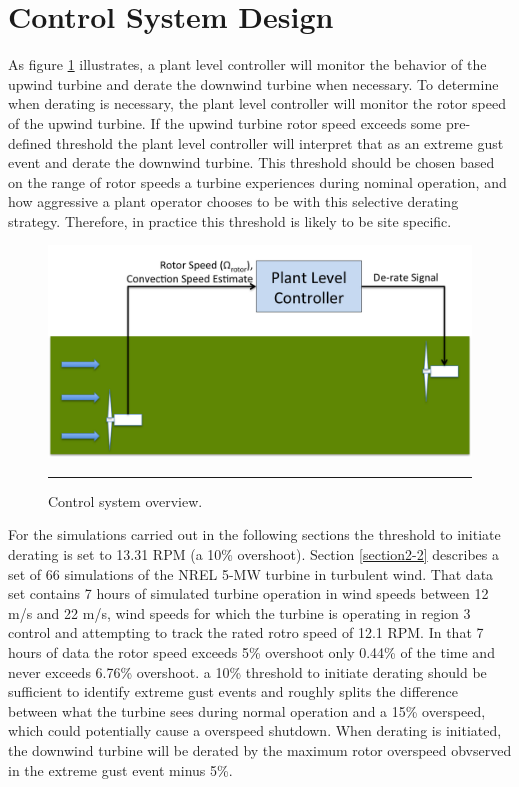 \section{Control System Design} \label{section4-5}

As figure \ref{fig4-20} illustrates, a plant level controller will monitor the behavior of the upwind turbine and derate the downwind turbine when necessary. To determine when derating is necessary, the plant level controller will monitor the rotor speed of the upwind turbine. If the upwind turbine rotor speed exceeds some pre-defined threshold the plant level controller will interpret that as an extreme gust event and derate the downwind turbine. This threshold should be chosen based on the range of rotor speeds a turbine experiences during nominal operation, and how aggressive a plant operator chooses to be with this selective derating strategy. Therefore, in practice this threshold is likely to be site specific. 

\begin{figure}[htbp]
	\centering
		\includegraphics[width = \linewidth]{Figures/ch4Figures/fig4-20.png}
		\rule{35em}{0.5pt}
	\caption{Control system overview.}
	\label{fig4-20}
\end{figure}


For the simulations carried out in the following sections the threshold to initiate derating is set to 13.31 RPM (a 10\% overshoot). Section \ref{section2-2} describes a set of 66 simulations of the NREL 5-MW turbine in turbulent wind. That data set contains 7 hours of simulated turbine operation in wind speeds between 12 m/s and 22 m/s, wind speeds for which the turbine is operating in region 3 control and attempting to track the rated rotro speed of 12.1 RPM. In that 7 hours of data the rotor speed exceeds 5\% overshoot only 0.44\% of the time and never exceeds 6.76\% overshoot. a 10\% threshold to initiate derating should be sufficient to identify extreme gust events and roughly splits the difference between what the turbine sees during normal operation and a 15\% overspeed, which could potentially cause a overspeed shutdown. When derating is initiated, the downwind turbine will be derated by the maximum rotor overspeed obvserved in the extreme gust event minus 5\%. 

